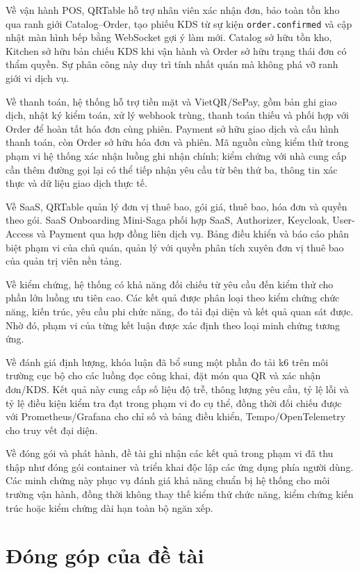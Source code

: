 Về vận hành POS, QRTable hỗ trợ nhân viên xác nhận đơn, bảo toàn tồn kho qua ranh giới Catalog--Order, tạo phiếu KDS từ sự kiện \texttt{order.confirmed} và cập nhật màn hình bếp bằng WebSocket gợi ý làm mới. Catalog sở hữu tồn kho, Kitchen sở hữu bản chiếu KDS khi vận hành và Order sở hữu trạng thái đơn có thẩm quyền. Sự phân công này duy trì tính nhất quán mà không phá vỡ ranh giới vi dịch vụ.

Về thanh toán, hệ thống hỗ trợ tiền mặt và VietQR/SePay, gồm bản ghi giao dịch, nhật ký kiểm toán, xử lý webhook trùng, thanh toán thiếu và phối hợp với Order để hoàn tất hóa đơn cùng phiên. Payment sở hữu giao dịch và cấu hình thanh toán, còn Order sở hữu hóa đơn và phiên. Mã nguồn cùng kiểm thử trong phạm vi hệ thống xác nhận luồng ghi nhận chính; kiểm chứng với nhà cung cấp cần thêm đường gọi lại có thể tiếp nhận yêu cầu từ bên thứ ba, thông tin xác thực và dữ liệu giao dịch thực tế.

Về SaaS, QRTable quản lý đơn vị thuê bao, gói giá, thuê bao, hóa đơn và quyền theo gói. SaaS Onboarding Mini-Saga phối hợp SaaS, Authorizer, Keycloak, User-Access và Payment qua hợp đồng liên dịch vụ. Bảng điều khiển và báo cáo phân biệt phạm vi của chủ quán, quản lý với quyền phân tích xuyên đơn vị thuê bao của quản trị viên nền tảng.

Về kiểm chứng, hệ thống có khả năng đối chiếu từ yêu cầu đến kiểm thử cho phần lớn luồng ưu tiên cao. Các kết quả được phân loại theo kiểm chứng chức năng, kiến trúc, yêu cầu phi chức năng, đo tải đại diện và kết quả quan sát được. Nhờ đó, phạm vi của từng kết luận được xác định theo loại minh chứng tương ứng.

Về đánh giá định lượng, khóa luận đã bổ sung một phần đo tải k6 trên môi trường cục bộ cho các luồng đọc công khai, đặt món qua QR và xác nhận đơn/KDS. Kết quả này cung cấp số liệu độ trễ, thông lượng yêu cầu, tỷ lệ lỗi và tỷ lệ điều kiện kiểm tra đạt trong phạm vi đo cụ thể, đồng thời đối chiếu được với Prometheus/Grafana cho chỉ số và bảng điều khiển, Tempo/OpenTelemetry cho truy vết đại diện.

Về đóng gói và phát hành, đề tài ghi nhận các kết quả trong phạm vi đã thu thập như đóng gói container và triển khai độc lập các ứng dụng phía người dùng. Các minh chứng này phục vụ đánh giá khả năng chuẩn bị hệ thống cho môi trường vận hành, đồng thời không thay thế kiểm thử chức năng, kiểm chứng kiến trúc hoặc kiểm chứng dài hạn toàn bộ ngăn xếp.

\section{Đóng góp của đề tài}

